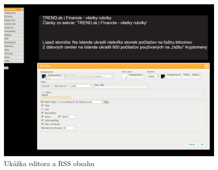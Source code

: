 \documentclass[11pt, oneside]{report}
\begin{document}
\begin{figure}[h]
    \centering
    \includegraphics[width=1\textwidth]{RSS}
    \caption{Ukážka editora a RSS obsahu}
    \label{fig:rsseditor}
\end{figure}
\end{document}
